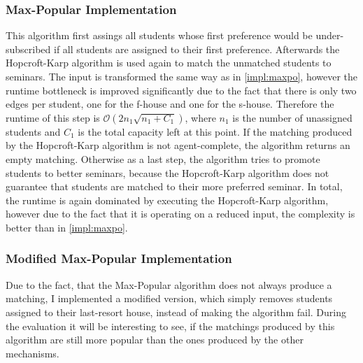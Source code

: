 \subsubsection{Max-Popular Implementation}
This algorithm first assings all students whose first preference would be under-subscribed if all students are assigned to their first preference. Afterwards the Hopcroft-Karp algorithm is used again to match the unmatched students to seminars. The input is transformed the same way as in \ref{impl:maxpo}, however the runtime bottleneck is improved significantly due to the fact that there is only two edges per student, one for the f-house and one for the s-house. Therefore the runtime of this step is $\mathcal{O}(2n_1\sqrt{n_1+C_1})$, where $n_1$ is the number of unassigned students and $C_1$ is the total capacity left at this point. If the matching produced by the Hopcroft-Karp algorithm is not agent-complete, the algorithm returns an empty matching. Otherwise as a last step, the algorithm tries to promote students to better seminars, because the Hopcroft-Karp algorithm does not guarantee that students are matched to their more preferred seminar. In total, the runtime is again dominated by executing the Hopcroft-Karp algorithm, however due to the fact that it is operating on a reduced input, the complexity is better than in \ref{impl:maxpo}.

\subsubsection{Modified Max-Popular Implementation}\label{impl:mod-max-pop}
Due to the fact, that the Max-Popular algorithm does not always produce a matching, I implemented a modified version, which simply removes students assigned to their last-resort house, instead of making the algorithm fail. During the evaluation it will be interesting to see, if the matchings produced by this algorithm are still more popular than the ones produced by the other mechanisms.

